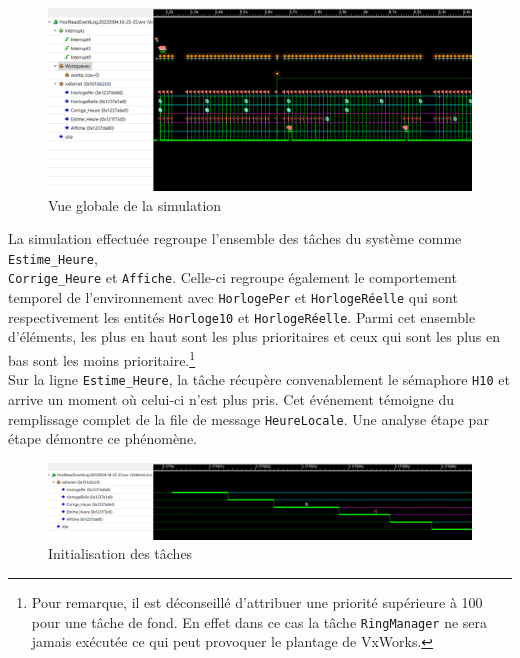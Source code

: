 \documentclass[french]{article}
\begin{document}
	
	\begin{figure}[H]
		\centering
		\includegraphics[width=1\linewidth]{../affichage_ralenti/vue_globale.PNG}
		\caption{Vue globale de la simulation}
		\label{fig:vue_globale}
	\end{figure}
	
	La simulation effectuée regroupe l'ensemble des tâches du système comme \texttt{Estime\_Heure},\\ \texttt{Corrige\_Heure} et \texttt{Affiche}. Celle-ci regroupe également le comportement temporel de l'environnement avec \texttt{HorlogePer} et \texttt{HorlogeRéelle} qui sont respectivement les entités \texttt{Horloge10} et \texttt{HorlogeRéelle}. Parmi cet ensemble d'éléments, les plus en haut sont les plus prioritaires et ceux qui sont les plus en bas sont les moins prioritaire.\footnote{Pour remarque, il est déconseillé d'attribuer une priorité supérieure à 100 pour une tâche de fond. En effet dans ce cas la tâche \texttt{RingManager} ne sera jamais exécutée ce qui peut provoquer le plantage de VxWorks.}\\
	Sur la ligne \texttt{Estime\_Heure}, la tâche récupère convenablement le sémaphore \texttt{H10} et arrive un moment où celui-ci n'est plus pris. Cet événement témoigne du remplissage complet de la file de message \texttt{HeureLocale}. Une analyse étape par étape démontre ce phénomène.
	
	\begin{figure}[H]
		\centering
		\includegraphics[width=1\linewidth]{../affichage_ralenti/lancement des taches.PNG}
		\caption{Initialisation des tâches}
		\label{fig:init_task_classique}
	\end{figure}
\end{document}
